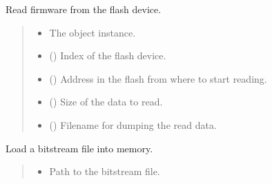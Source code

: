 \documentclass[letterpaper,10pt,english]{sphinxmanual}
\begin{document}
\begin{fulllineitems}
\begin{fulllineitems}
\label{\detokenize{cplddocs:management_flash.MngProgFlash.firmwareRead}}
\pysigstartsignatures
{}
\pysigstopsignatures
\sphinxAtStartPar
Read firmware from the flash device.
\begin{quote}\begin{description}
\begin{itemize}
\item {} 
\sphinxAtStartPar
{} \textendash{} The object instance.

\item {} 
\sphinxAtStartPar
{} () \textendash{} Index of the flash device.

\item {} 
\sphinxAtStartPar
{} () \textendash{} Address in the flash from where to start reading.

\item {} 
\sphinxAtStartPar
{} () \textendash{} Size of the data to read.

\item {} 
\sphinxAtStartPar
{} () \textendash{} Filename for dumping the read data.

\end{itemize}

\end{description}\end{quote}

\end{fulllineitems}


\begin{fulllineitems}
\label{\detokenize{cplddocs:management_flash.MngProgFlash.loadBitstream}}
\pysigstartsignatures
{}
\pysigstopsignatures
\sphinxAtStartPar
Load a bitstream file into memory.
\begin{quote}\begin{description}
\begin{itemize}
\item {} 
\sphinxAtStartPar
{} \textendash{} Path to the bitstream file.


\end{itemize}
\end{description}
\end{quote}
\end{fulllineitems}
\end{fulllineitems}
\end{document}
